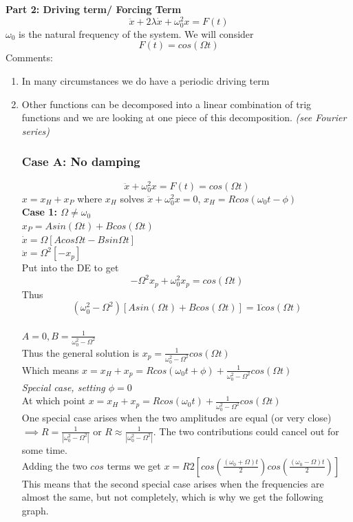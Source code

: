\documentclass[11pt]{article}
\theoremstyle{definition}
\begin{document}
\textbf{Part 2: Driving term/ Forcing Term}
$$\ddot{x} + 2\lambda \dot{x} + \omega_0^2x = F(t)$$
$\omega_0$ is the natural frequency of the system.
We will consider $$F(t) = cos(\Omega t)$$
Comments:\begin{enumerate}[topsep=-10pt]
    \item In many circumstances we do have a periodic driving term
    \item Other functions can be decomposed into a linear combination of trig functions and we are looking at one piece of this decomposition.
    \textit{(see Fourier series)}
\subsubsection{Case A: No damping}
$$\ddot{x} + \omega_0^2x = F(t) = cos(\Omega t)$$
$x = x_H + x_P$ where $x_H$ solves $\ddot{x} + \omega_0^2x = 0$, $x_H = Rcos(\omega_0 t - \phi)$\\
\textbf{Case 1: $\Omega \neq \omega_0$}\\
$x_P = Asin(\Omega t) + Bcos(\Omega t)$\\
$\dot{x}  = \Omega[A cos\Omega t - Bsin\Omega t]$\\
$\ddot{x} = \Omega^2 [-x_p]$\\
Put into the DE to get
$$-\Omega^2x_p + \omega_0^2x_p = cos(\Omega t)$$
Thus
$$(\omega_0^2-\Omega^2)[Asin(\Omega t) + Bcos(\Omega t)] = 1\dot cos(\Omega t)$$\\
$A = 0, B = \frac{1}{\omega_0^2-\Omega^2}$\\
Thus the general solution is $x_p = \frac{1}{\omega_0^2-\Omega^2} cos(\Omega t)$\\
Which means $x = x_H + x_p = Rcos(\omega_0t + \phi) + \frac{1}{\omega_0^2-\Omega^2} cos(\Omega t)$\\
\textit{Special case, setting $\phi = 0$}\\
At which point $x = x_H + x_p = Rcos(\omega_0t) + \frac{1}{\omega_0^2-\Omega^2} cos(\Omega t)$\\
One special case arises when the two amplitudes are equal (or very close) $\implies R = \frac{1}{|\omega_0^2-\Omega^2|}$ or $R \approx \frac{1}{|\omega_0^2-\Omega^2|}$. The two contributions could cancel out for some time.\\
Adding the two $cos$ terms we get $x = R2[cos(\frac{(\omega_0 + \Omega)t}{2})cos(\frac{(\omega_0 - \Omega)t}{2})]$\\
This means that the second special case arises when the frequencies are almost the same, but not completely, which is why we get the following graph.\\

\end{enumerate}
\end{document}
